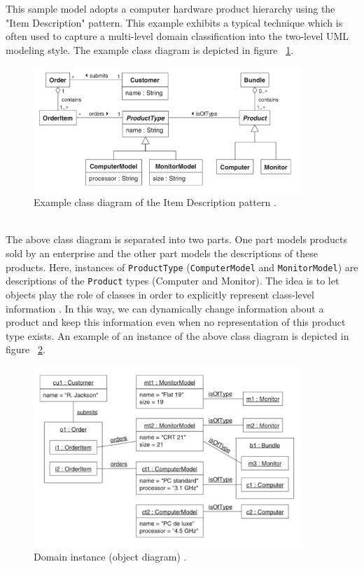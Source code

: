 This sample model adopts a computer hardware product hierarchy using the "Item Description" pattern. This example exhibits a typical technique which is often used to capture a multi-level domain classification into the two-level UML modeling style. The example class diagram is depicted in figure ~\ref{fig:cd_itemdesc}.
\begin{figure}[h!]
\centering
\includegraphics[width=0.9\textwidth]{images/chap2_cd_itemdesc.png}
\caption{Example class diagram of the Item Description pattern \cite{AccidentalComplexity}.}
\label{fig:cd_itemdesc}
\end{figure} \\
The above class diagram is separated into two parts. One part models products sold by an enterprise and the other part models the descriptions of these products. Here, instances of \texttt{ProductType} (\texttt{ComputerModel} and \texttt{MonitorModel}) are descriptions of the \texttt{Product} types (Computer and Monitor). The idea is to let objects play the role of classes in order to explicitly represent class-level information \cite{AccidentalComplexity}. In this way, we can dynamically change information about a product and keep this information even when no representation of this product type exists. An example of an instance of the above class diagram is depicted in figure ~\ref{fig:domain_instance}.
\begin{figure}[h!]
\centering
\includegraphics[width=0.9\textwidth]{images/chap2_domain_instance.png}
\caption{Domain instance (object diagram) \cite{AccidentalComplexity}.}
\label{fig:domain_instance}
\end{figure} \\
